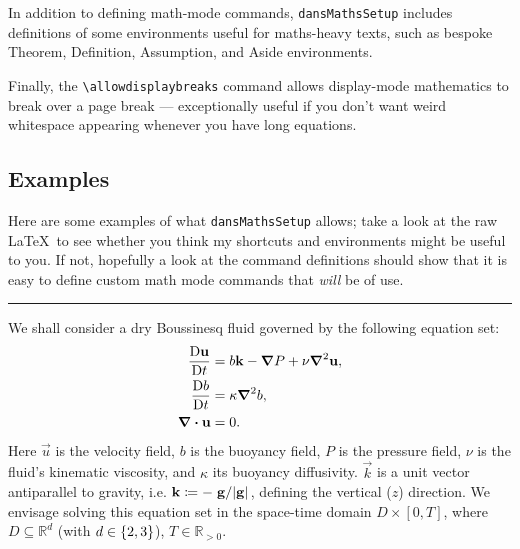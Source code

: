 In addition to defining math-mode commands, \texttt{dansMathsSetup} includes definitions of some environments useful for maths-heavy texts, such as bespoke Theorem, Definition, Assumption, and Aside environments.

Finally, the \verb!\allowdisplaybreaks! command allows display-mode mathematics to break over a page break --- exceptionally useful if you don't want weird whitespace appearing whenever you have long equations.

\subsection{Examples}
Here are some examples of what \texttt{dansMathsSetup} allows; take a look at the raw \LaTeX\ to see whether you think my shortcuts and environments might be useful to you.
If not, hopefully a look at the command definitions should show that it is easy to define custom math mode commands that \textit{will} be of use.

\noindent\rule{\textwidth}{0.4pt}

We shall consider a dry Boussinesq fluid governed by the following equation set:
\begin{align}
    \frac{\operatorname{D}\!{\boldsymbol{\mathbf{u}}}}{\operatorname{D}\!{t}}
    &=
    b \boldsymbol{\mathbf{k}}
  - \grad{P}
  + \nu \grad^2{\boldsymbol{\mathbf{u}}},
    \label{eq:SFBoussinesq_momentum}
    \\
    \frac{\operatorname{D}\!{b}}{\operatorname{D}\!{t}}
    &=
    \kappa\grad^2{b},
    \label{eq:SFBoussinesq_buoyancy}
    \\
    \div{\ensuremath{\boldsymbol{\mathbf{u}}}}
    &=
    0.
    \label{eq:SFBoussinesq_mass}
\end{align}
Here $\vec{u}$ is the velocity field, $b$ is the buoyancy field, $P$ is the pressure field, $\nu$ is the fluid's kinematic viscosity, and $\kappa$ its buoyancy diffusivity.
$\vec{k}$ is a unit vector antiparallel to gravity, i.e. $\vec{k} \coloneqq - \flatfrac{\vec{g}}{\abs{\vec{g}}}$, defining the vertical ($\unit{z}$) direction.
We envisage solving this equation set in the space-time domain $D \times [0,T]$, where $D \subseteq \mathbb{R}^d$ (with $d \in  \left\{ 2,3 \right\} $), $T \in \mathbb{R}_{>0}$.

